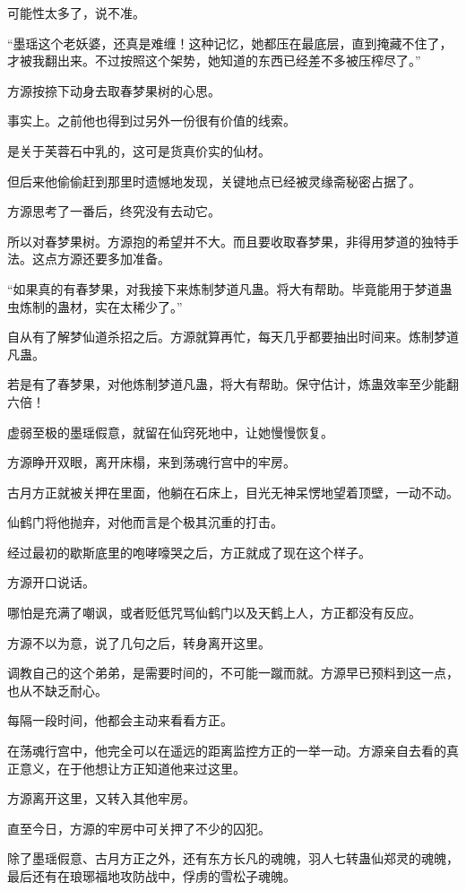 \begin{this_body}
可能性太多了，说不准。

“墨瑶这个老妖婆，还真是难缠！这种记忆，她都压在最底层，直到掩藏不住了，才被我翻出来。不过按照这个架势，她知道的东西已经差不多被压榨尽了。”

方源按捺下动身去取春梦果树的心思。

事实上。之前他也得到过另外一份很有价值的线索。

是关于芙蓉石中乳的，这可是货真价实的仙材。

但后来他偷偷赶到那里时遗憾地发现，关键地点已经被灵缘斋秘密占据了。

方源思考了一番后，终究没有去动它。

所以对春梦果树。方源抱的希望并不大。而且要收取春梦果，非得用梦道的独特手法。这点方源还要多加准备。

“如果真的有春梦果，对我接下来炼制梦道凡蛊。将大有帮助。毕竟能用于梦道蛊虫炼制的蛊材，实在太稀少了。”

自从有了解梦仙道杀招之后。方源就算再忙，每天几乎都要抽出时间来。炼制梦道凡蛊。

若是有了春梦果，对他炼制梦道凡蛊，将大有帮助。保守估计，炼蛊效率至少能翻六倍！

虚弱至极的墨瑶假意，就留在仙窍死地中，让她慢慢恢复。

方源睁开双眼，离开床榻，来到荡魂行宫中的牢房。

古月方正就被关押在里面，他躺在石床上，目光无神呆愣地望着顶壁，一动不动。

仙鹤门将他抛弃，对他而言是个极其沉重的打击。

经过最初的歇斯底里的咆哮嚎哭之后，方正就成了现在这个样子。

方源开口说话。

哪怕是充满了嘲讽，或者贬低咒骂仙鹤门以及天鹤上人，方正都没有反应。

方源不以为意，说了几句之后，转身离开这里。

调教自己的这个弟弟，是需要时间的，不可能一蹴而就。方源早已预料到这一点，也从不缺乏耐心。

每隔一段时间，他都会主动来看看方正。

在荡魂行宫中，他完全可以在遥远的距离监控方正的一举一动。方源亲自去看的真正意义，在于他想让方正知道他来过这里。

方源离开这里，又转入其他牢房。

直至今日，方源的牢房中可关押了不少的囚犯。

除了墨瑶假意、古月方正之外，还有东方长凡的魂魄，羽人七转蛊仙郑灵的魂魄，最后还有在琅琊福地攻防战中，俘虏的雪松子魂魄。


\end{this_body}
